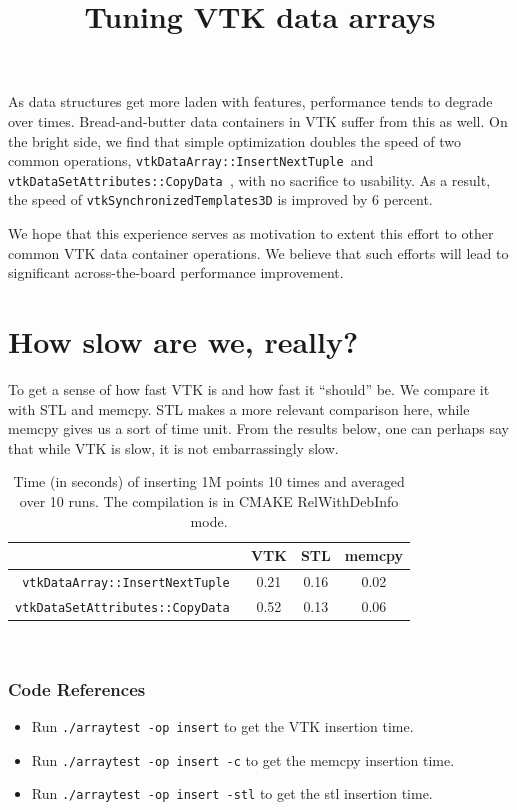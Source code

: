 \documentclass{article}
\def \insertt {{\tt vtkDataArray::InsertNextTuple~}}
\def \copydata {{\tt vtkDataSetAttributes::CopyData~}}
\begin{document}
\date{}
\title{Tuning VTK data arrays}
\maketitle
As data structures get more laden with features, performance tends to
degrade over times. Bread-and-butter data containers in VTK suffer
from this as well. On the bright side, we find that simple
optimization doubles the speed of two common operations, \insertt and
\copydata, with no sacrifice to usability. As a result, the speed of
{\tt vtkSynchronizedTemplates3D} is improved by 6 percent.

We hope that this experience serves as motivation to extent this
effort to other common VTK data container operations. We believe that
such efforts will lead to significant across-the-board performance
improvement.

\section{How slow are we, really?}
To get a sense of how fast VTK is and how fast it ``should'' be. We
compare it with STL and memcpy. STL makes a more relevant comparison
here, while memcpy gives us a sort of time unit. From the results
below, one can perhaps say that while VTK is slow, it is not
embarrassingly slow.

\begin{table}[h]
\centering
\begin{tabular}{r|c|c|c}
 &  VTK & STL & memcpy\\
\hline
\insertt & 0.21 & 0.16 & 0.02 \\
\hline
\copydata & 0.52 &  0.13 &  0.06\\
\end{tabular}
\caption{Time (in seconds) of inserting 1M points 10 times and
  averaged over 10 runs. The compilation is in CMAKE RelWithDebInfo mode.}\
\label{tab:initial}
\end{table}

\subsubsection*{Code References}
\begin{itemize}
\item Run {\tt ./arraytest -op insert} to get the VTK insertion time.
\item Run {\tt ./arraytest -op insert -c} to get the memcpy insertion time.
\item Run {\tt ./arraytest -op insert -stl} to get the stl insertion time.
\end{itemize}
\end{document}
